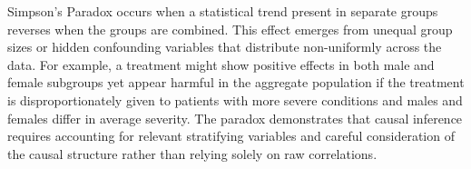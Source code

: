 Simpson's Paradox occurs when a statistical trend present in separate groups reverses when the groups are combined. This effect emerges from unequal group sizes or hidden confounding variables that distribute non-uniformly across the data. For example, a treatment might show positive effects in both male and female subgroups yet appear harmful in the aggregate population if the treatment is disproportionately given to patients with more severe conditions and males and females differ in average severity. The paradox demonstrates that causal inference requires accounting for relevant stratifying variables and careful consideration of the causal structure rather than relying solely on raw correlations.
